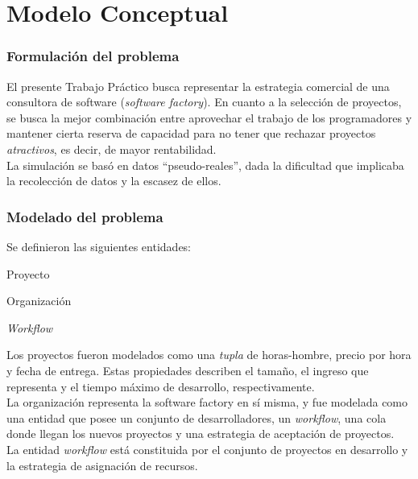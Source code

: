 \part*{Modelo Conceptual}

\section{Formulación del problema}

El presente Trabajo Práctico busca representar la estrategia comercial de una consultora de software (\textit{software factory}). En cuanto a la selección de proyectos, se busca 
la mejor combinación entre aprovechar el trabajo de los programadores y mantener cierta reserva de capacidad para no tener que rechazar proyectos \textit{atractivos}, es decir,
de mayor rentabilidad.\\

La simulación se basó en datos ``pseudo-reales'', dada la dificultad que implicaba la recolección de datos y la escasez de ellos.\\

\section{Modelado del problema}

Se definieron las siguientes entidades:

\begin{itemize*}
    \item Proyecto
    \item Organización
    \item \textit{Workflow}
\end{itemize*}

Los proyectos fueron modelados como una \textit{tupla} de horas-hombre, precio por hora y fecha de entrega. Estas propiedades describen el tamaño, el ingreso que representa y el
tiempo máximo de desarrollo, respectivamente.\\

La organización representa la software factory en sí misma, y fue modelada como una entidad que posee un conjunto de desarrolladores, un \textit{workflow}, una cola donde 
llegan los nuevos proyectos y una estrategia de aceptación de proyectos.\\

La entidad \textit{workflow} está constituida por el conjunto de proyectos en desarrollo y la estrategia de asignación de recursos.\\

